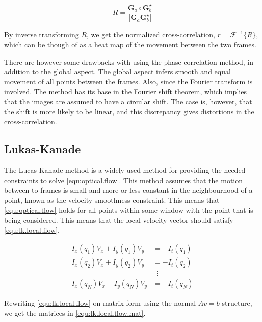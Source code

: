 \begin{equation}\label{equ:phase.cross.power}
	R = \frac{\textbf{G}_a \circ \textbf{G}_b^\star}{|\textbf{G}_a \textbf{G}_b^\star|}
\end{equation}

By inverse transforming $R$, we get the normalized cross-correlation, $r = \mathcal{F}^{-1}\{R\}$, which can be though of as a 
heat map of the movement between the two frames.

There are however some drawbacks with using the phase correlation method, in addition to the global aspect. The global aspect 
infers smooth and equal movement of all points between the frames. Also, since the Fourier transform is involved. The method has its base 
in the Fourier shift theorem, which implies that the images are assumed to have a circular shift. The case is, however, that the shift 
is more likely to be linear, and this discrepancy gives distortions in the cross-correlation.

\subsection{Lukas-Kanade}\label{sec:lukas-kanade}
The Lucas-Kanade method is a widely used method for providing the needed constraints to solve \eqref{equ:optical.flow}. This method assumes that 
the motion between to frames is small and more or less constant in the neighbourhood of a point, known as the velocity smoothness constraint. 
This means that \eqref{equ:optical.flow} holds for all points within some window
with the point that is being considered. This means that the local velocity vector should satisfy \eqref{equ:lk.local.flow}.

\begin{equation}\label{equ:lk.local.flow}
	\begin{split}
		I_x(q_1)V_x + I_y(q_1)V_y	&= -I_t(q_1) \\
		I_x(q_2)V_x + I_y(q_2)V_y 	&= -I_t(q_2) \\
		&\,\,\, \vdots \\
		I_x(q_N)V_x + I_y(q_N)V_y 	&= -I_t(q_N)
	\end{split}
\end{equation}

Rewriting \eqref{equ:lk.local.flow} on matrix form using the normal $Av = b$ structure, we get the matrices in \eqref{equ:lk.local.flow.mat}.


